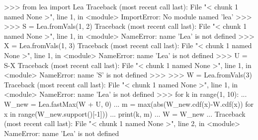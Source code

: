 
>>> from lea import Lea
Traceback (most recent call last):
  File "< chunk 1 named None >", line 1, in <module>
ImportError: No module named 'lea'
>>>
>>> S = Lea.fromVals(1,  2)
Traceback (most recent call last):
  File "< chunk 1 named None >", line 1, in <module>
NameError: name 'Lea' is not defined
>>> X = Lea.fromVals(1,  3)
Traceback (most recent call last):
  File "< chunk 1 named None >", line 1, in <module>
NameError: name 'Lea' is not defined
>>> U = S-X
Traceback (most recent call last):
  File "< chunk 1 named None >", line 1, in <module>
NameError: name 'S' is not defined
>>>
>>> W = Lea.fromVals(3)
Traceback (most recent call last):
  File "< chunk 1 named None >", line 1, in <module>
NameError: name 'Lea' is not defined
>>> for k in range(1, 10):
...     W_new = Lea.fastMax(W + U, 0)
...     m = max(abs(W_new.cdf(x)-W.cdf(x)) for x in
range(W_new.support()[-1]))
...     print(k, m)
...     W = W_new
...
Traceback (most recent call last):
  File "< chunk 1 named None >", line 2, in <module>
NameError: name 'Lea' is not defined

